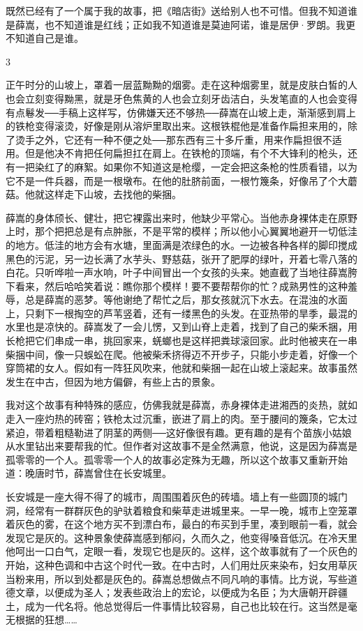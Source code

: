 既然已经有了一个属于我的故事，把《暗店街》送给别人也不可惜。但我不知道谁是薛嵩，也不知道谁是红线；正如我不知道谁是莫迪阿诺，谁是居伊·罗朗。我更不知道自己是谁。 

3 

正午时分的山坡上，罩着一层蓝黝黝的烟雾。走在这种烟雾里，就是皮肤白皙的人也会立刻变得黝黑，就是牙色焦黄的人也会立刻牙齿洁白，头发笔直的人也会变得有点鬈发──手稿上这样写，仿佛嫌天还不够热──薛嵩在山坡上走，渐渐感到肩上的铁枪变得滚烫，好像是刚从溶炉里取出来。这根铁棍他是准备作扁担来用的，除了烫手之外，它还有一种不便之处──那东西有三十多斤重，用来作扁担很不适用。但是他决不肯把任何扁担扛在肩上。在铁枪的顶端，有个不大锋利的枪头，还有一把染红了的麻絮。如果你不知道这是枪缨，一定会把这条枪的性质看错，以为它不是一件兵器，而是一根墩布。在他的肚脐前面，一根竹篾条，好像吊了个大蘑菇。他就这样走下山坡，去找他的柴捆。 

薛嵩的身体颀长、健壮，把它裸露出来时，他缺少平常心。当他赤身裸体走在原野上时，那个把把总是有点肿胀，不是平常的模样；所以他小心翼翼地避开一切低洼的地方。低洼的地方会有水塘，里面满是浓绿色的水。一边被各种各样的脚印搅成黑色的污泥，另一边长满了水芋头、野慈菇，张开了肥厚的绿叶，开着七零八落的白花。只听哗啦一声水响，叶子中间冒出一个女孩的头来。她直截了当地往薛嵩胯下看来，然后哈哈笑着说：瞧你那个模样！要不要帮帮你的忙？成熟男性的这种羞辱，总是薛嵩的恶梦。等他谢绝了帮忙之后，那女孩就沉下水去。在混浊的水面上，只剩下一根掏空的芦苇竖着，还有一缕黑色的头发。在亚热带的旱季，最混的水里也是凉快的。薛嵩发了一会儿愣，又到山脊上走着，找到了自己的柴禾捆，用长枪把它们串成一串，挑回家来，蜣螂也是这样把粪球滚回家。此时他被夹在一串柴捆中间，像一只蜈蚣在爬。他被柴禾挤得迈不开步子，只能小步走着，好像一个穿筒裙的女人。假如有一阵狂风吹来，他就和柴捆一起在山坡上滚起来。故事虽然发生在中古，但因为地方偏僻，有些上古的景象。 

我对这个故事有种特殊的感应，仿佛我就是薛嵩，赤身裸体走进湘西的炎热，就如走入一座灼热的砖窑；铁枪太过沉重，嵌进了肩上的肉。至于腰间的篾条，它太过紧迫，带着粗糙勒进了阴茎的两侧──这好像很有趣。更有趣的是有个苗族小姑娘从水里钻出来要帮我的忙。但作者对这故事不是全然满意，他说，这是因为薛嵩是孤零零的一个人。孤零零一个人的故事必定殊为无趣，所以这个故事又重新开始道：晚唐时节，薛嵩曾住在长安城里。 

长安城是一座大得不得了的城市，周围围着灰色的砖墙。墙上有一些圆顶的城门洞，经常有一群群灰色的驴驮着粮食和柴草走进城里来。一早一晚，城市上空笼罩着灰色的雾，在这个地方买不到漂白布，最白的布买到手里，凑到眼前一看，就会发现它是灰的。这种景象使薛嵩感到郁闷，久而久之，他变得嗓音低沉。在冷天里他呵出一口白气，定眼一看，发现它也是灰的。这样，这个故事就有了一个灰色的开始，这种色调和中古这个时代一致。在中古时，人们用灶灰来染布，妇女用草灰当粉来用，所以到处都是灰色的。薛嵩总想做点不同凡响的事情。比方说，写些道德文章，以便成为圣人；发表些政治上的宏论，以便成为名臣；为大唐朝开辟疆土，成为一代名将。他总觉得后一件事情比较容易，自己也比较在行。这当然是毫无根据的狂想…… 

